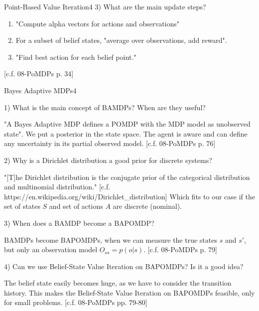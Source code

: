 \begin{questions}
\begin{question}{Point-Based Value Iteration}{4}
	3) What are the main update steps?
	\begin{answer}
		
		\begin{enumerate}
		\item "Compute alpha vectors for actions and observations"
		\item For a subset of belief states, "average over observations, add reward".
		\item "Find best action for each belief point."
		\end{enumerate}
		[c.f. 08-PoMDPs p. 34]
	\end{answer}
\end{question}


\begin{question}{Bayes Adaptive MDPs}{4}
	
	1) What is the main concept of BAMDPs? When are they useful?
	\begin{answer}
		
		"A Bayes Adaptive MDP defines a POMDP with the MDP model as unobserved state".
		We put a posterior in the state space. 
		The agent is aware and can define any uncertainty in its partial observed model.
		[c.f. 08-PoMDPs p. 76]
	\end{answer}
	
	2) Why is a Dirichlet distribution a good prior for discrete systems?
	\begin{answer}
		
		"[T]he Dirichlet distribution is the conjugate prior of the categorical distribution and multinomial distribution."
		[c.f. https://en.wikipedia.org/wiki/Dirichlet\_distribution]
		Which fits to our case if the set of states $S$ and set of actions $A$ are discrete (nominal).
	\end{answer}
	
		3) When does a BAMDP become a BAPOMDP?
	\begin{answer}
		
		BAMDPs become BAPOMDPs, when we can measure the true states $s$ and $s'$, but only an observation model $O_{os} = p(o|s)$.
		[c.f. 08-PoMDPs p. 79]
	\end{answer}
	
		4) Can we use Belief-State Value Iteration on BAPOMDPs? Is it a good idea?
		\begin{answer}
			
			The belief state easily becomes huge, as we have to consider the transition history. This makes the Belief-State Value Iteration on BAPOMDPs feasible, only for small problems.
			[c.f. 08-PoMDPs pp. 79-80]
		\end{answer}
\end{question}



\end{questions}
